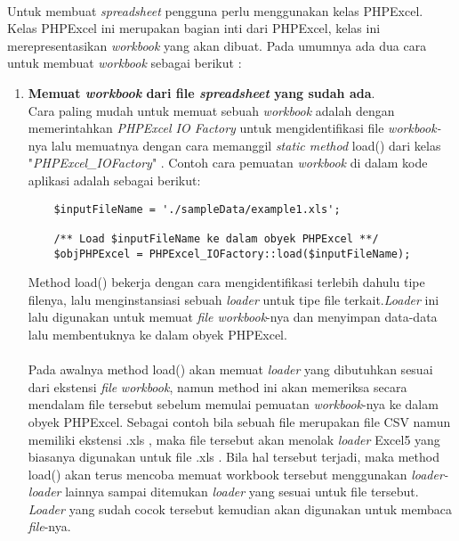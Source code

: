\paragraph{} Untuk membuat \textit{spreadsheet} pengguna perlu menggunakan kelas PHPExcel. Kelas PHPExcel ini merupakan bagian inti dari PHPExcel, kelas ini merepresentasikan \textit{workbook} yang akan dibuat. Pada umumnya ada dua cara untuk membuat \textit{workbook} sebagai berikut :\cite{phpexcel:14} 
\begin{enumerate}
	\item \textbf{Memuat \textit{workbook} dari file \textit{spreadsheet} yang sudah ada}.\\
Cara paling mudah untuk memuat sebuah \textit{workbook} adalah dengan memerintahkan \textit{PHPExcel IO Factory} untuk mengidentifikasi file \textit{workbook-}nya lalu memuatnya dengan cara memanggil \textit{static method} load() dari kelas "\textit{PHPExcel\_IOFactory}" . Contoh cara pemuatan \textit{workbook} di dalam kode aplikasi adalah sebagai berikut:
	\begin{lstlisting}
	$inputFileName = './sampleData/example1.xls';

	/** Load $inputFileName ke dalam obyek PHPExcel **/
	$objPHPExcel = PHPExcel_IOFactory::load($inputFileName);
	\end{lstlisting}
Method load() bekerja dengan cara mengidentifikasi terlebih dahulu tipe filenya, lalu menginstansiasi sebuah \textit{loader} untuk tipe file terkait.\textit{Loader} ini lalu digunakan untuk memuat \textit{file workbook}-nya dan menyimpan data-data lalu membentuknya ke dalam obyek PHPExcel. \cite{phpexcel:14} 
\paragraph{} Pada awalnya method load() akan memuat \textit{loader} yang dibutuhkan sesuai dari ekstensi \textit{file} \textit{workbook}, namun method ini akan memeriksa secara mendalam file tersebut sebelum memulai pemuatan \textit{workbook}-nya ke dalam obyek PHPExcel. Sebagai contoh bila sebuah file merupakan file CSV namun memiliki ekstensi .xls , maka file tersebut akan menolak \textit{loader} Excel5 yang biasanya digunakan untuk file .xls . Bila hal tersebut terjadi, maka method load() akan terus mencoba memuat workbook tersebut menggunakan \textit{loader-loader} lainnya sampai ditemukan \textit{loader} yang sesuai untuk file tersebut.  \textit{Loader} yang sudah cocok tersebut kemudian akan digunakan untuk membaca \textit{file}-nya.\cite{phpexcel:14} 

\end{enumerate}

